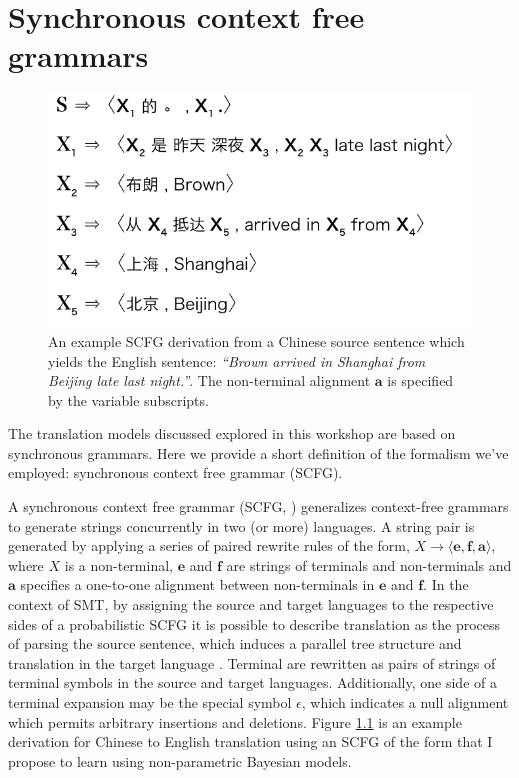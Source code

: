 
\chapter{Synchronous context free grammars} \label{sec:scfg}

\begin{figure}[t]
\begin{center}
\includegraphics[width=0.6\columnwidth]{example_derivation2.pdf}
\end{center}
\caption[Derivation]{An example SCFG derivation from a Chinese source sentence which yields the English sentence: {\em ``Brown arrived in Shanghai from Beijing late last night.''}. The non-terminal alignment $\mathbf{a}$ is specified by the variable subscripts.}
\label{fig:intro_example_derivation}
\end{figure}

The translation models discussed explored in this workshop are based on synchronous grammars. 
Here we provide a short definition of the formalism we've employed: synchronous context free grammar (SCFG).

A synchronous context free grammar (SCFG, \cite{lewis68scfg}) generalizes context-free grammars to generate strings concurrently in two (or more) languages. A string pair is generated by applying a series of paired rewrite rules of the form, $X \rightarrow \langle \mathbf{e}, \mathbf{f}, \mathbf{a} \rangle$, where $X$ is a non-terminal, $\mathbf{e}$ and $\mathbf{f}$ are strings of terminals and non-terminals and $\mathbf{a}$ specifies a one-to-one alignment between non-terminals in $\mathbf{e}$ and $\mathbf{f}$.
In the context of SMT, by assigning the source and target languages to the respective sides of a probabilistic SCFG it is possible to describe translation as the process of parsing the source sentence, which induces a parallel tree structure and translation in the target language \cite{chiang07hierarchical}.  
Terminal are rewritten as pairs of strings of terminal symbols in the source and target languages.  Additionally, one side of a terminal expansion may be the special symbol $\epsilon$, which indicates a null alignment which permits arbitrary insertions and deletions.
Figure \ref{fig:intro_example_derivation} is an example derivation for Chinese to English translation using an SCFG of the form that I propose to learn using non-parametric Bayesian models.

